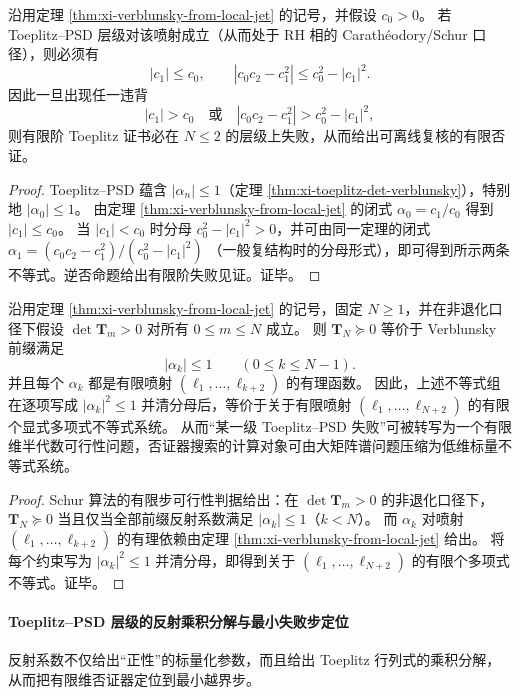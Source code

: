 \begin{corollary}\label{cor:xi-horizon-order2-reflection-falsifier}
沿用定理 \ref{thm:xi-verblunsky-from-local-jet} 的记号，并假设 \(c_0>0\)。
若 Toeplitz--PSD 层级对该喷射成立（从而处于 RH 相的 Carath\'eodory/Schur 口径），则必须有
\[
\boxed{\;
|c_1|\le c_0,\qquad
|c_0c_2-c_1^2|\le c_0^2-|c_1|^2.\;}
\]
因此一旦出现任一违背
\[
|c_1|>c_0
\quad\text{或}\quad
|c_0c_2-c_1^2|>c_0^2-|c_1|^2,
\]
则有限阶 Toeplitz 证书必在 \(N\le 2\) 的层级上失败，从而给出可离线复核的有限否证。
\end{corollary}
\begin{proof}
Toeplitz--PSD 蕴含 \(|\alpha_n|\le 1\)（定理 \ref{thm:xi-toeplitz-det-verblunsky}），特别地 \(|\alpha_0|\le 1\)。
由定理 \ref{thm:xi-verblunsky-from-local-jet} 的闭式
\(
\alpha_0=c_1/c_0
\)
得到 \(|c_1|\le c_0\)。
当 \(|c_1|<c_0\) 时分母 \(c_0^2-|c_1|^2>0\)，并可由同一定理的闭式
\(
\alpha_1=(c_0c_2-c_1^2)/(c_0^2-|c_1|^2)
\)
（一般复结构时的分母形式），即可得到所示两条不等式。逆否命题给出有限阶失败见证。证毕。
\end{proof}

\begin{corollary}\label{cor:xi-toeplitz-psd-jet-semialgebraic}
沿用定理 \ref{thm:xi-verblunsky-from-local-jet} 的记号，固定 \(N\ge 1\)，并在非退化口径下假设
\(\det\mathbf{T}_m>0\) 对所有 \(0\le m\le N\) 成立。
则 \(\mathbf{T}_N\succeq 0\) 等价于 Verblunsky 前缀满足
\[
|\alpha_k|\le 1\qquad(0\le k\le N-1).
\]
并且每个 \(\alpha_k\) 都是有限喷射 \((\ell_1,\dots,\ell_{k+2})\) 的有理函数。
因此，上述不等式组在逐项写成 \(|\alpha_k|^2\le 1\) 并清分母后，等价于关于有限喷射 \((\ell_1,\dots,\ell_{N+2})\) 的有限个显式多项式不等式系统。
从而“某一级 Toeplitz--PSD 失败”可被转写为一个有限维半代数可行性问题，否证器搜索的计算对象可由大矩阵谱问题压缩为低维标量不等式系统。
\end{corollary}
\begin{proof}
Schur 算法的有限步可行性判据给出：在 \(\det\mathbf{T}_m>0\) 的非退化口径下，\(\mathbf{T}_N\succeq 0\) 当且仅当全部前缀反射系数满足 \(|\alpha_k|\le 1\)（\(k<N\)）。
而 \(\alpha_k\) 对喷射 \((\ell_1,\dots,\ell_{k+2})\) 的有理依赖由定理 \ref{thm:xi-verblunsky-from-local-jet} 给出。
将每个约束写为 \(|\alpha_k|^2\le 1\) 并清分母，即得到关于 \((\ell_1,\dots,\ell_{N+2})\) 的有限个多项式不等式。证毕。
\end{proof}

\paragraph{Toeplitz--PSD 层级的反射乘积分解与最小失败步定位}
反射系数不仅给出“正性”的标量化参数，而且给出 Toeplitz 行列式的乘积分解，从而把有限维否证器定位到最小越界步。

